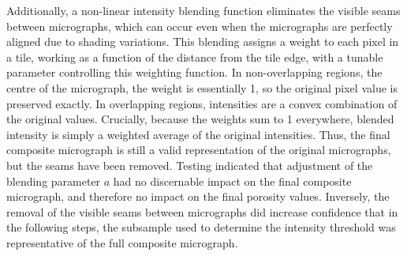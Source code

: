 \documentclass[review]{elsarticle}
\begin{document}
Additionally, a non-linear intensity blending function eliminates the visible
seams between micrographs, which can occur even when the micrographs are
perfectly aligned due to shading variations. This blending assigns a weight to
each pixel in a tile, working as a function of the distance from the tile edge,
with a tunable parameter controlling this weighting function. In
non-overlapping regions, the centre of the micrograph, the weight is essentially
1, so the original pixel value is preserved exactly. In overlapping regions,
intensities are a convex combination of the original values. Crucially, because
the weights sum to 1 everywhere, blended intensity is simply a weighted average
of the original intensities. Thus, the final composite micrograph is still a
valid representation of the original micrographs, but the seams have been
removed.  \citep{Preibisch2009} Testing indicated that adjustment of the
blending parameter \(a\) had no discernable impact on the final composite
micrograph, and therefore no impact on the final porosity values. Inversely, the
removal of the visible seams between micrographs did increase confidence that in
the following steps, the subsample used to determine the intensity threshold was
representative of the full composite micrograph.
\clearpage


\end{document}
